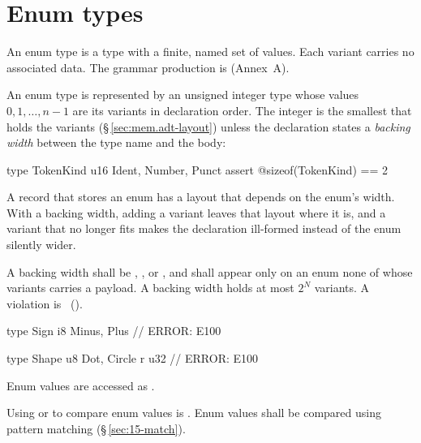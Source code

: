 \section{Enum types}
\label{sec:types.enum}

\pnum
An enum type is a type with a finite, named set of values.  Each variant
carries no associated data.  The grammar production is
 (Annex~A).

\pnum
An enum type is represented by an unsigned integer type whose values \(0, 1, \ldots, n-1\)
are its variants in declaration order. The integer is the smallest that holds the variants
(\S\,\ref{sec:mem.adt-layout}) unless the declaration states a \textit{backing width}
between the type name and the body:

\begin{example}
\begin{laincode}
type TokenKind u16 { Ident, Number, Punct }
assert @sizeof(TokenKind) == 2
\end{laincode}
\end{example}

\pnum
A record that stores an enum has a layout that depends on the enum's width. With a backing
width, adding a variant leaves that layout where it is, and a variant that no longer fits
makes the declaration ill-formed instead of the enum silently wider.

\begin{constraint}
  A backing width shall be , ,  or , and shall appear
  only on an enum none of whose variants carries a payload. A backing width  holds at
  most \(2^N\) variants. A violation is \illformed{}~().
\end{constraint}

\begin{example}
\begin{laincode}
type Sign i8 { Minus, Plus }             // ERROR: E100
\end{laincode}
\begin{laincode}
type Shape u8 { Dot, Circle { r u32 } }  // ERROR: E100
\end{laincode}
\end{example}

\pnum
Enum values are accessed as .

\begin{constraint}
  Using \lain{==} or \lain{!=} to compare enum values is \illformed{}.
  Enum values shall be compared using  pattern matching
  (\S\,\ref{sec:15-match}).
\end{constraint}

